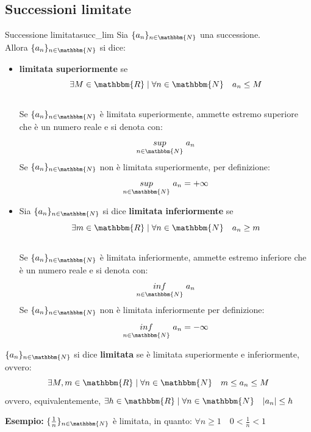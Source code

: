 \documentclass[12pt]{report}
\newcounter{definition}
\newcommand{\nmu}{}
\begin{document}
	\subsection{Successioni limitate}
	\begin{definition}{\nmu Successione limitata}{succ_lim}
		Sia $\{a_n\}_{n \in \mathbbm{N}}$ una successione. \\
		Allora $\{a_n\}_{n \in \mathbbm{N}}$ si dice:
		\begin{itemize}
			\item \textbf{limitata superiormente} se \[\exists M \in \mathbbm{R} \mid \forall n \in \mathbbm{N} \quad a_n \leq M\] \\
			Se $\{a_n\}_{n \in \mathbbm{N}}$ è limitata superiormente, ammette estremo superiore che è un numero reale e si denota con:
			\[
			\underset{n \in \mathbbm{N}}{sup}\ a_n
			\]
			Se $\{a_n\}_{n \in \mathbbm{N}}$ non è limitata superiormente, per definizione:
			\[
			\underset{n \in \mathbbm{N}}{sup}\ a_n = +\infty
			\]
			\item Sia $\{a_n\}_{n \in \mathbbm{N}}$ si dice \textbf{limitata inferiormente} se \[\exists m \in \mathbbm{R} \mid \forall n \in \mathbbm{N} \quad a_n \geq m\] \\
			Se $\{a_n\}_{n \in \mathbbm{N}}$ è limitata inferiormente, ammette estremo inferiore che è un numero reale e si denota con:
			\[
			\underset{n \in \mathbbm{N}}{inf}\ a_n
			\]
			Se $\{a_n\}_{n \in \mathbbm{N}}$ non è limitata inferiormente per definizione:
			\[
			\underset{n \in \mathbbm{N}}{inf}\ a_n = -\infty
			\]
		\end{itemize}
		$\{a_n\}_{n \in \mathbbm{N}}$ si dice \textbf{limitata} se è limitata superiormente e inferiormente, ovvero:
		\[
		\exists M, m \in \mathbbm{R} \mid \forall n \in \mathbbm{N} \quad m \leq a_n \leq M
		\]
		ovvero, equivalentemente, $\exists h \in \mathbbm{R} \mid \forall n \in \mathbbm{N} \quad |a_n| \leq h$
	\end{definition}
	\textbf{Esempio: }$\{\frac{1}{n}\}_{n \in \mathbbm{N}}$ è limitata, in quanto: $\forall n \geq 1 \quad 0 < \frac{1}{n} < 1$ \\
\end{document}
